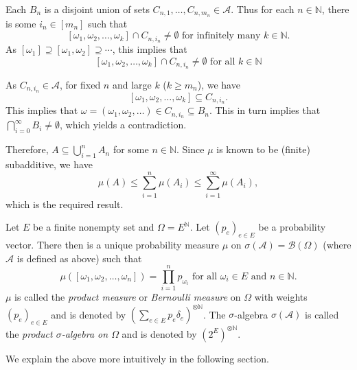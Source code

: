 Each $B_n$ is a disjoint union of sets $C_{n,1},\ldots,C_{n,m_n}\in\mathcal{A}$. Thus for each $n\in\mathbb{N}$, there is some $i_n\in[m_n]$ such that
$$[\omega_1,\omega_2,\ldots,\omega_k]\cap C_{n,i_n}\neq\emptyset\text{ for infinitely many }k\in\mathbb{N}.$$
As $[\omega_1]\supseteq[\omega_1,\omega_2]\supseteq\cdots$, this implies that
$$[\omega_1,\omega_2,\ldots,\omega_k]\cap C_{n,i_n}\neq\emptyset\text{ for all } k\in\mathbb{N}$$

As $C_{n,i_n}\in\mathcal{A}$, for fixed $n$ and large $k$ ($k\geq m_n$), we have $$[\omega_1,\omega_2,\ldots,\omega_k]\subseteq C_{n,i_n}.$$
This implies that $\omega=(\omega_1,\omega_2,\ldots)\in C_{n,i_n}\subseteq B_n$. This in turn implies that $\bigcap_{i=0}^\infty B_i\neq\emptyset$, which yields a contradiction.

Therefore, $A\subseteq\bigcup_{i=1}^n A_n$ for some $n\in\mathbb{N}$. Since $\mu$ is known to be (finite) subadditive, we have
$$\mu(A)\leq \sum_{i=1}^n\mu(A_i)\leq \sum_{i=1}^\infty \mu(A_i),$$
which is the required result.

\begin{definition}
\label{defProductMeasure}
    Let $E$ be a finite nonempty set and $\Omega=E^\mathbb{N}$. Let $(p_e)_{e\in E}$ be a probability vector. There then is a unique probability measure $\mu$ on $\sigma(\mathcal{A})=\mathcal{B}(\Omega)$ (where $\mathcal{A}$ is defined as above) such that
    $$\mu([\omega_1,\omega_2,\ldots,\omega_n])=\prod_{i=1}^n p_{\omega_i}\text{ for all $\omega_i\in E$ and $n\in\mathbb{N}$}.$$
    $\mu$ is called the \textit{product measure} or \textit{Bernoulli measure} on $\Omega$ with weights $(p_e)_{e\in E}$ and is denoted by $\left(\sum_{e\in E}p_e\delta_e\right)^{\otimes\mathbb{N}}$. The $\sigma$-algebra $\sigma(\mathcal{A})$ is called the \textit{product $\sigma$-algebra on $\Omega$} and is denoted by $(2^E)^{\otimes\mathbb{N}}$.
\end{definition}

We explain the above more intuitively in the following section.
\clearpage